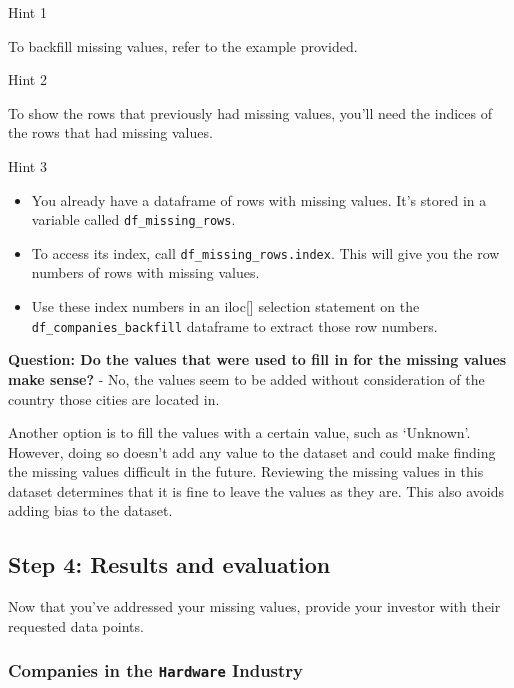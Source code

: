 \documentclass[11pt]{article}
\providecommand{\tightlist}{%
      \setlength{\itemsep}{0pt}\setlength{\parskip}{0pt}}
\begin{document}
    Hint 1

To backfill missing values, refer to the example provided.

    Hint 2

To show the rows that previously had missing values, you'll need the
indices of the rows that had missing values.

    Hint 3

\begin{itemize}
\tightlist
\item
  You already have a dataframe of rows with missing values. It's stored
  in a variable called \texttt{df\_missing\_rows}.\\
\item
  To access its index, call \texttt{df\_missing\_rows.index}. This will
  give you the row numbers of rows with missing values.\\
\item
  Use these index numbers in an iloc{[}{]} selection statement on the
  \texttt{df\_companies\_backfill} dataframe to extract those row
  numbers.
\end{itemize}

    \textbf{Question: Do the values that were used to fill in for the
missing values make sense?} - No, the values seem to be added without
consideration of the country those cities are located in.

    Another option is to fill the values with a certain value, such as
`Unknown'. However, doing so doesn't add any value to the dataset and
could make finding the missing values difficult in the future. Reviewing
the missing values in this dataset determines that it is fine to leave
the values as they are. This also avoids adding bias to the dataset.

    \hypertarget{step-4-results-and-evaluation}{%
\subsection{Step 4: Results and
evaluation}\label{step-4-results-and-evaluation}}

    Now that you've addressed your missing values, provide your investor
with their requested data points.

    \hypertarget{companies-in-the-hardware-industry}{%
\subsubsection{\texorpdfstring{Companies in the \texttt{Hardware}
Industry}{Companies in the Hardware Industry}}\label{companies-in-the-hardware-industry}}
\end{document}

